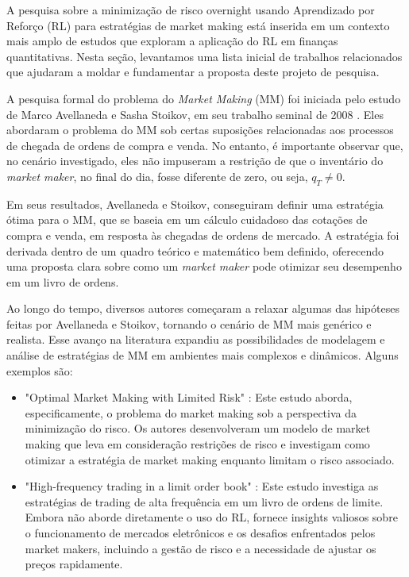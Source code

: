 A pesquisa sobre a minimização de risco overnight usando Aprendizado por Reforço (RL) para estratégias de market making está inserida em um contexto mais amplo de estudos que exploram a aplicação do RL em finanças quantitativas. Nesta seção, levantamos uma lista inicial de trabalhos relacionados que ajudaram a moldar e fundamentar a proposta deste projeto de pesquisa.

A pesquisa formal do problema do \textit{Market Making} (MM) foi iniciada pelo estudo de  Marco Avellaneda e Sasha Stoikov, em seu trabalho seminal de 2008 \citep{Avellaneda2008}. Eles abordaram o problema do MM sob certas suposições relacionadas aos processos de chegada de ordens de compra e venda. No entanto, é importante observar que, no cenário investigado, eles não impuseram a restrição de que o inventário do \textit{market maker}, no final do dia, fosse diferente de zero, ou seja, $q_T \neq 0$.

Em seus resultados, Avellaneda e Stoikov, conseguiram definir uma estratégia ótima para o MM, que se baseia em um cálculo cuidadoso das cotações de compra e venda, em resposta às chegadas de ordens de mercado. A estratégia foi derivada dentro de um quadro teórico e matemático bem definido, oferecendo uma proposta clara sobre como um \textit{market maker} pode otimizar seu desempenho em um livro de ordens.

Ao longo do tempo, diversos autores começaram a relaxar algumas das hipóteses feitas por Avellaneda e Stoikov, tornando o cenário de MM mais genérico e realista. Esse avanço na literatura expandiu as possibilidades de modelagem e análise de estratégias de MM em ambientes mais complexos e dinâmicos. Alguns exemplos são:
\begin{itemize}
    \item "Optimal Market Making with Limited Risk" \citep{Gueant2017}: Este estudo aborda, especificamente, o problema do market making sob a perspectiva da minimização do risco. Os autores desenvolveram um modelo de market making que leva em consideração restrições de risco e investigam como otimizar a estratégia de market making enquanto limitam o risco associado.
    \item "High-frequency trading in a limit order book" \citep{Avellaneda2008}: Este estudo investiga as estratégias de trading de alta frequência em um livro de ordens de limite. Embora não aborde diretamente o uso do RL, fornece insights valiosos sobre o funcionamento de mercados eletrônicos e os desafios enfrentados pelos market makers, incluindo a gestão de risco e a necessidade de ajustar os preços rapidamente.
\end{itemize}


